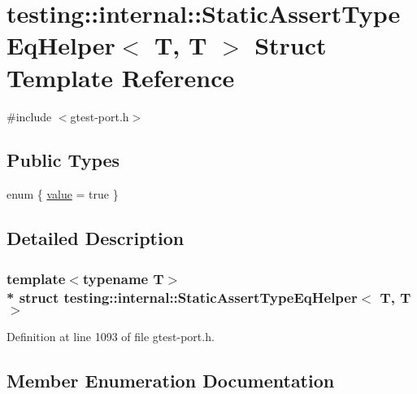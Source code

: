 \hypertarget{structtesting_1_1internal_1_1_static_assert_type_eq_helper_3_01_t_00_01_t_01_4}{}\section{testing\+:\+:internal\+:\+:Static\+Assert\+Type\+Eq\+Helper$<$ T, T $>$ Struct Template Reference}
\label{structtesting_1_1internal_1_1_static_assert_type_eq_helper_3_01_t_00_01_t_01_4}


{\ttfamily \#include $<$gtest-\/port.\+h$>$}

\subsection*{Public Types}
\begin{DoxyCompactItemize}
\item 
enum \{ \hyperlink{structtesting_1_1internal_1_1_static_assert_type_eq_helper_3_01_t_00_01_t_01_4_acdb69a9c4164628ea6a80bd6442058c6a63c475f543e4e977d43c5093dd2b7f3f}{value} = true
 \}
\end{DoxyCompactItemize}


\subsection{Detailed Description}
\subsubsection*{template$<$typename T$>$\\*
struct testing\+::internal\+::\+Static\+Assert\+Type\+Eq\+Helper$<$ T, T $>$}



Definition at line 1093 of file gtest-\/port.\+h.



\subsection{Member Enumeration Documentation}
